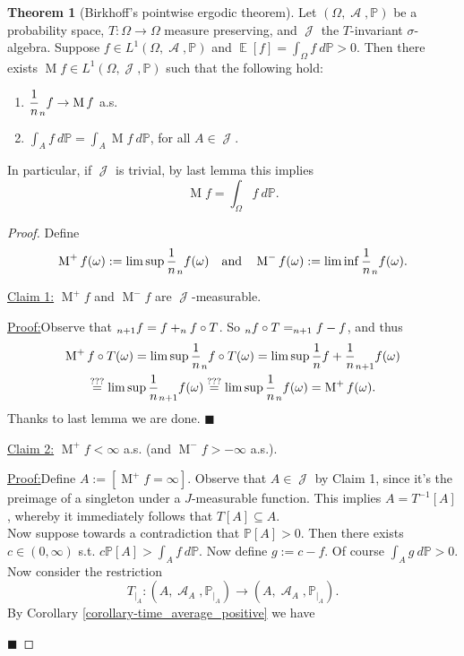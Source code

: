 \documentclass[12pt,a4paper]{report}
\theoremstyle{definition}
\newtheorem{theorem}{Theorem}[chapter] %
\theoremstyle{num.custom-title}
\newenvironment{claim}[1]{\par\noindent\underline{Claim#1:}\space}{} %
\newenvironment{claimproof}[1]{\par\noindent\underline{Proof:}\space#1}{\leavevmode\unskip\penalty9999 \hbox{}\nobreak\hfill\quad\hbox{$\blacksquare$}} %
\DeclareMathOperator{\A}{\mathcal{A}}
\DeclareMathOperator{\E}{\mathbb{E}}
\DeclareMathOperator{\J}{\mathcal{J}}
\DeclareMathOperator{\sse}{\subseteq}
\let\S\relax %
\DeclareMathOperator{\S}{S}
\newcommand{\M}{\mathcal{M}}
\renewcommand{\1}{\mathbbm{1}}
\renewcommand{\P}{\mathbb{P}}
\begin{document}
\begin{theorem}[Birkhoff's pointwise ergodic theorem]
\renewcommand{\M}{\operatorname{M}}
Let $(\Omega,\A,\P)$ be a probability space, $T \colon \Omega \to \Omega$ measure preserving, and $\J$ the $T$-invariant $\sigma$-algebra. Suppose $f \in L^1(\Omega,\A,\P)$ and $\E[f] = \int_\Omega f \ d\P > 0$. Then there exists $\M f \in L^1(\Omega,\J,\P)$ such that the following hold:
\begin{enumerate}
\item $\displaystyle \frac{1}{n} \S_n f \to \M f$ a.s.
\item $\displaystyle \int_A f \ d\P = \int_A \M f \ d\P$, for all $A \in \J$.
\end{enumerate}
In particular, if $\J$ is trivial, by last lemma this implies
\[
\M f = \int_\Omega f \ d\P.
\]
\begin{proof}
Define 
\[
\M^+ f(\omega) := \limsup \frac{1}{n} \S_n f(\omega) \quad \text{and} \quad \M^- f(\omega) := \liminf \frac{1}{n} \S_n f(\omega).
\]
\begin{claim}{ 1}
$\M^+ f$ and $\M^- f$ are $\J$-measurable.
\begin{claimproof}
Observe that $\S_{n+1} f = f + \S_n f \circ T$. So $\S_n f \circ T = \S_{n+1} f -f$, and thus
\begin{multline*}
\M^+ f \circ T (\omega) = \limsup \frac{1}{n} \S_n f \circ T (\omega) = \limsup \frac{1}{n} f + \frac{1}{n} \S_{n+1} f (\omega) \\
\stackrel{???}{=} \limsup \frac{1}{n} \S_{n+1} f (\omega) \stackrel{???}{=} \limsup \frac{1}{n} \S_n f (\omega) = \M^+ f(\omega).
\end{multline*}
Thanks to last lemma we are done.
\end{claimproof}
\end{claim}\\
\begin{claim}{ 2}
$\M^+ f < \infty$ a.s. (and $\M^- f > -\infty$ a.s.).
\begin{claimproof}
Define $A := [\M^+ f = \infty]$. Observe that $A \in \J$ by Claim 1, since it's the preimage of a singleton under a $J$-measurable function. This implies $A=T^{-1}[A]$, whereby it immediately follows that $T[A] \sse A$.\\
Now suppose towards a contradiction that $\P[A]>0$. Then there exists $c \in (0,\infty)$ s.t. $c\P[A] > \int_A f \ d\P$. Now define $g := c-f$. Of course $\int_A g \ d\P > 0$. Now consider the restriction
\[
T_{|_A} \colon (A,\A_A,\P_{|_A}) \to (A,\A_A,\P_{|_A}).
\]
By Corollary \ref{corollary-time_average_positive} we have

\end{claimproof}
\end{claim}
\end{proof}
\end{theorem}
\end{document}
